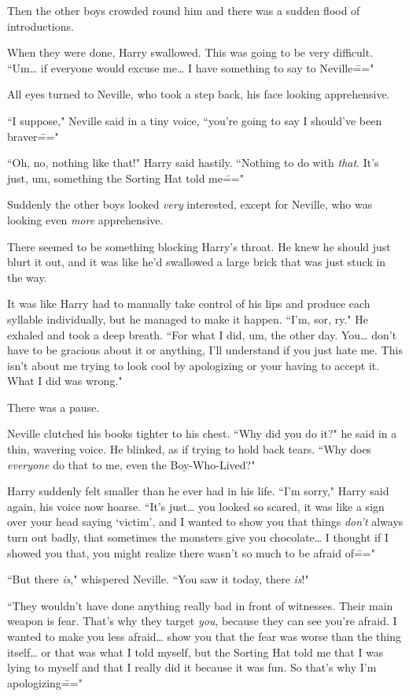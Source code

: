 Then the other boys crowded round him and there was a sudden flood of introductions.

When they were done, Harry swallowed. This was going to be very difficult. ``Um{\ldots} if everyone would excuse me{\ldots} I have something to say to Neville\==="

All eyes turned to Neville, who took a step back, his face looking apprehensive.

``I suppose," Neville said in a tiny voice, ``you're going to say I should've been braver\==="

``Oh, no, nothing like that!" Harry said hastily. ``Nothing to do with \emph{that}. It's just, um, something the Sorting Hat told me\==="

Suddenly the other boys looked \emph{very} interested, except for Neville, who was looking even \emph{more} apprehensive.

There seemed to be something blocking Harry's throat. He knew he should just blurt it out, and it was like he'd swallowed a large brick that was just stuck in the way.

It was like Harry had to manually take control of his lips and produce each syllable individually, but he managed to make it happen. ``I'm, sor, ry." He exhaled and took a deep breath. ``For what I did, um, the other day. You{\ldots} don't have to be gracious about it or anything, I'll understand if you just hate me. This isn't about me trying to look cool by apologizing or your having to accept it. What I did was wrong."

There was a pause.

Neville clutched his books tighter to his chest. ``Why did you do it?" he said in a thin, wavering voice. He blinked, as if trying to hold back tears. ``Why does \emph{everyone} do that to me, even the Boy-Who-Lived?"

Harry suddenly felt smaller than he ever had in his life. ``I'm sorry," Harry said again, his voice now hoarse. ``It's just{\ldots} you looked so scared, it was like a sign over your head saying `victim', and I wanted to show you that things \emph{don't} always turn out badly, that sometimes the monsters give you chocolate{\ldots} I thought if I showed you that, you might realize there wasn't so much to be afraid of\==="

``But there \emph{is}," whispered Neville. ``You saw it today, there \emph{is}!"

``They wouldn't have done anything really bad in front of witnesses. Their main weapon is fear. That's why they target \emph{you}, because they can see you're afraid. I wanted to make you less afraid{\ldots} show you that the fear was worse than the thing itself{\ldots} or that was what I told myself, but the Sorting Hat told me that I was lying to myself and that I really did it because it was fun. So that's why I'm apologizing\==="

